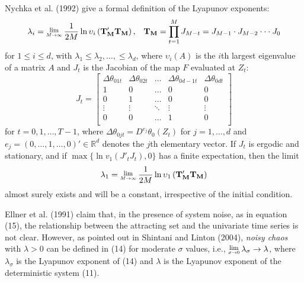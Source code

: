 \documentclass[12pt]{article}
\newcommand{\Lim}[1]{\raisebox{0.5ex}{\scalebox{0.8}{$\displaystyle \lim_{#1}\;$}}}
\begin{document}
Nychka et al. (1992) give a formal definition of the Lyapunov exponents:
\begin{equation}
\lambda_i=\Lim{M \rightarrow \infty}\frac{1}{2M}\ln\upsilon_i\left(\mathbf{T_{M}'T_{M}}\right),\,\,\,\,\,\mathbf{T_{M}}=\prod_{t=1}^{M}J_{M-t}=
J_{M-1}\cdot J_{M-2}\cdot\cdot\cdot J_{0}
\end{equation}
for $1\leq i \leq d$, with $\lambda_1\leq \lambda_2,\ldots,\leq \lambda_d$, where $\upsilon_i(A)$ is the $i$th largest eigenvalue of a matrix $A$ and
$J_t$ is the
Jacobian of the map $F$ evaluated at $Z_{t}$:
\begin{equation}
J_{t}=\left[\begin{array}{ccccc}
\Delta\theta_{01t} & \Delta\theta_{02t} & \ldots & \Delta\theta_{0d-1t} & \Delta\theta_{0dt}\\
1                  &  0                 & \ldots & 0                    & 0                 \\
0                  &  1                 & \ldots & 0                    & 0                 \\
\vdots             &  \vdots            & \ddots & \vdots               & \vdots            \\
0                  &  0                 & \ldots & 1                    & 0                 \\
\end{array}
\right]
\end{equation}
for $t=0, 1, \ldots, T-1$, where $\Delta\theta_{0jt}=D^{e_{j}}\theta_{0}(Z_{t})$
for $j=1, \ldots, d$ and $e_{j}=(0, \ldots, 1, \ldots, 0)'\in\mathbb{R}^{d}$
denotes the $j$th elementary vector. 
If $J_t$ is ergodic and stationary, and if $\max \{\ln v_1(J'_tJ_t), 0\}$ has a finite expectation, then 
the limit
\begin{equation}
\lambda_1=\Lim{M \rightarrow \infty}\frac{1}{2M}\ln\upsilon_1\left(\mathbf{T_{M}'T_{M}}\right)
\end{equation}
almost surely exists and will be a constant, irrespective of the initial condition. 


Ellner et al. (1991) claim that, in the presence of system noise, as in equation (15), the relationship between the attracting set and the univariate time series is not clear. However, as pointed out in Shintani and Linton (2004), 
\textit{noisy chaos} with $\lambda>0$
can be defined in (14) for moderate $\sigma$ values, i.e., $\Lim{\sigma\rightarrow 0}\lambda_\sigma \rightarrow \lambda$, where $\lambda_\sigma$ is the Lyapunov exponent of (14) and $\lambda$ is the Lyapunov exponent of the deterministic system (11). 
\end{document}
